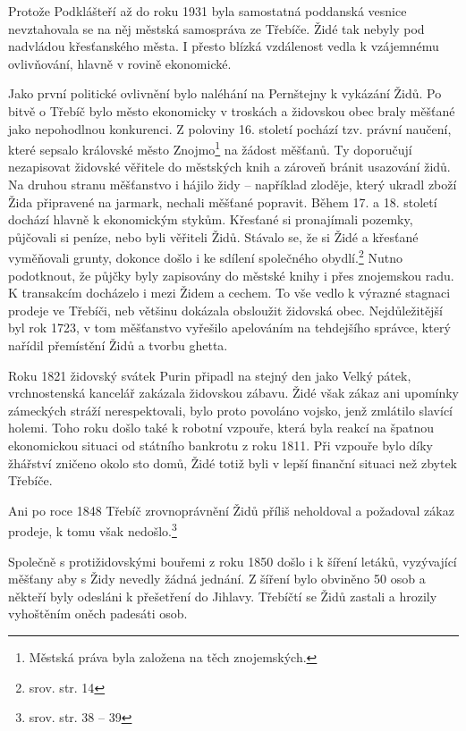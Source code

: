 \documentclass[a4paper,oneside,12pt]{report}
\begin{document}
Protože Podklášteří až do roku 1931 byla samostatná poddanská vesnice nevztahovala se na něj městská samospráva ze Třebíče.
Židé tak nebyly pod nadvládou křesťanského města.
I přesto blízká vzdálenost vedla k vzájemnému ovlivňování, hlavně v rovině ekonomické.

Jako první politické ovlivnění bylo naléhání na Pernštejny k vykázání Židů.
Po bitvě o Třebíč bylo město ekonomicky v troskách a židovskou obec braly měšťané jako nepohodlnou konkurenci.
Z poloviny 16. století pochází tzv. právní naučení, které sepsalo královské město Znojmo\footnote{Městská práva byla založena na těch znojemských.} na žádost měšťanů.
Ty doporučují nezapisovat židovské věřitele do městských knih a zároveň bránit usazování židů.
Na druhou stranu měšťanstvo i hájilo židy -- například zloděje, který ukradl zboží Žida připravené na jarmark, nechali měšťané popravit.
Během 17. a 18. století dochází hlavně k ekonomickým stykům.
Křesťané si pronajímali pozemky, půjčovali si peníze, nebo byli věřiteli Židů.
Stávalo se, že si Židé a křesťané vyměňovali grunty, dokonce došlo i ke sdílení společného obydlí.\footnote{srov. \cite{Kracmova2011} str. 14}
Nutno podotknout, že půjčky byly zapisovány do městské knihy i přes znojemskou radu.
K transakcím docházelo i mezi Židem a cechem.
To vše vedlo k výrazné stagnaci prodeje ve Třebíči, neb většinu dokázala obsloužit židovská obec.
Nejdůležitější byl rok 1723, v tom  měšťanstvo vyřešilo  apelováním na tehdejšího správce, který nařídil přemístění Židů a tvorbu ghetta.

Roku 1821 židovský svátek Purin připadl na stejný den jako Velký pátek, vrchnostenská kancelář zakázala židovskou zábavu.
Židé však zákaz ani upomínky zámeckých stráží nerespektovali, bylo proto povoláno vojsko, jenž zmlátilo slavící holemi.
Toho roku došlo také k robotní vzpouře, která byla reakcí na špatnou ekonomickou situaci od státního bankrotu z roku 1811.
Při vzpouře bylo díky žhářství zničeno okolo sto domů, Židé totiž byli v lepší finanční situaci než zbytek Třebíče.

Ani po roce 1848 Třebíč zrovnoprávnění Židů příliš neholdoval a požadoval zákaz prodeje, k tomu však nedošlo.\footnote{srov. \cite{Fiser2005} str. 38 -- 39}

Společně s protižidovskými bouřemi z roku 1850 došlo i k šíření letáků, vyzývající měšťany aby s Židy nevedly žádná jednání.
Z šíření bylo obviněno 50 osob a někteří byly odesláni k přešetření do Jihlavy.
Třebíčtí se Židů zastali a hrozily vyhoštěním oněch padesáti osob.
\end{document}

